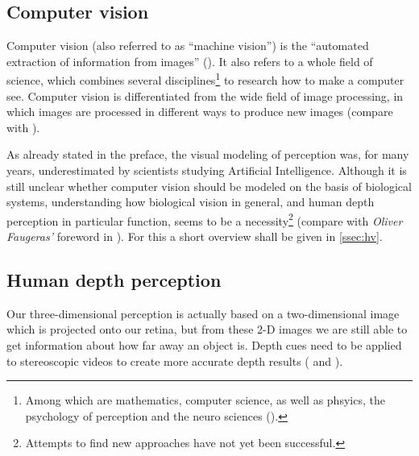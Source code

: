 \subsection{Computer vision}\label{ssec:cv}
Computer vision (also referred to as \enquote{machine vision}) is the \enquote{automated extraction of information from images} (\cite{Lowe.2016}). It also refers to a whole field of science, which combines several disciplines\footnote{Among which are mathematics, computer science, as well as phsyics, the psychology of perception and the neuro sciences (\cite[p.xi]{Hartley.2011}).} to research how to make a computer see. Computer vision is differentiated from the wide field of image processing, in which images are processed in different ways to produce new images (compare with \cite{Lowe.2016}).
 
As already stated in the preface, the visual modeling of perception was, for many years, underestimated by scientists studying Artificial Intelligence. Although it is still unclear whether computer vision should be modeled on the basis of biological systems, understanding how biological vision in general, and human depth perception in particular function, seems to be a necessity\footnote{Attempts to find new approaches have not yet been successful.} (compare with \textit{Oliver Faugeras'} foreword in \cite[p.xi]{Hartley.2011}). For this a short overview shall be given in \autoref{ssec:hv}.  

 
\subsection{Human depth perception}\label{ssec:hv}
Our three-dimensional perception is actually based on a two-dimensional image which is projected onto our retina, but from these 2-D images we are still able to get information about how far away an object is.  Depth cues need to be applied to stereoscopic videos to create more accurate depth results (\cite[p.226]{Goldstein.2015} and \cite[p.28]{Hottong.2009}). 

